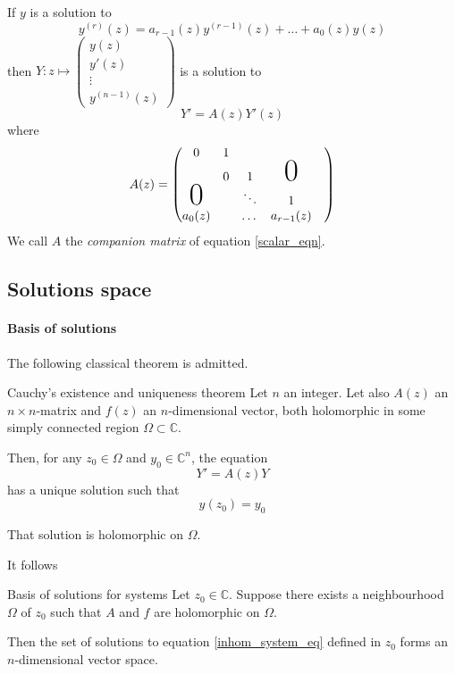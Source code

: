 \documentclass[../main.tex]{subfiles}
\begin{document}
If $y$ is a solution to 
\begin{equation*}\label{scalar_eqn}
	y^{(r)}(z) = a_{r - 1}(z) y^{(r - 1)}(z) + \dots + a_0(z) y(z)
\end{equation*}
then
$Y : z \mapsto \begin{pmatrix}
y(z)\\
y'(z)\\
\vdots \\
y^{(n - 1)}(z)
\end{pmatrix}$
is a solution to
\begin{equation*}
	Y' = A(z)Y'(z)
\end{equation*} where
\begin{equation*}
A(z)=
\begin{pmatrix}
0&1&&&\\
 &0&1&\mbox{\Huge 0}\\
 \mbox{\Huge 0}& &\ddots & 1\\
a_0(z) & & \dots & a_{r - 1}(z)
\end{pmatrix}
\end{equation*}
We call $A$ the \emph{companion matrix} of equation \eqref{scalar_eqn}.

\subsection*{Solutions space}

\paragraph{Basis of solutions}

The following classical theorem is admitted.

\begin{thm}{Cauchy's existence and uniqueness theorem}\label{thm_cauchy}
	Let $n$ an integer. Let also $A(z)$ an $n \times n$-matrix and $f(z)$ an $n$-dimensional vector, both holomorphic in some simply connected region $\Omega \subset \mathbb{C}$.
	
	Then, for any $z_0 \in \Omega$ and $y_0 \in \mathbb{C}^n$, the equation
	\begin{equation}\label{inhom_system_eq}
	Y' = A(z) Y
	\end{equation}
	has a unique solution such that
	\begin{equation*}
		y(z_0) = y_0
	\end{equation*}
	
	That solution is holomorphic on $\Omega$.
\end{thm}

It follows

\begin{cor}{Basis of solutions for systems}
	Let $z_0 \in \mathbb{C}$. Suppose there exists a neighbourhood $\Omega$ of $z_0$ such that $A$ and $f$ are holomorphic on $\Omega$.
	
	Then the set of solutions to equation \eqref{inhom_system_eq} defined in $z_0$ forms an $n$-dimensional vector space. 
\end{cor}
\end{document}
